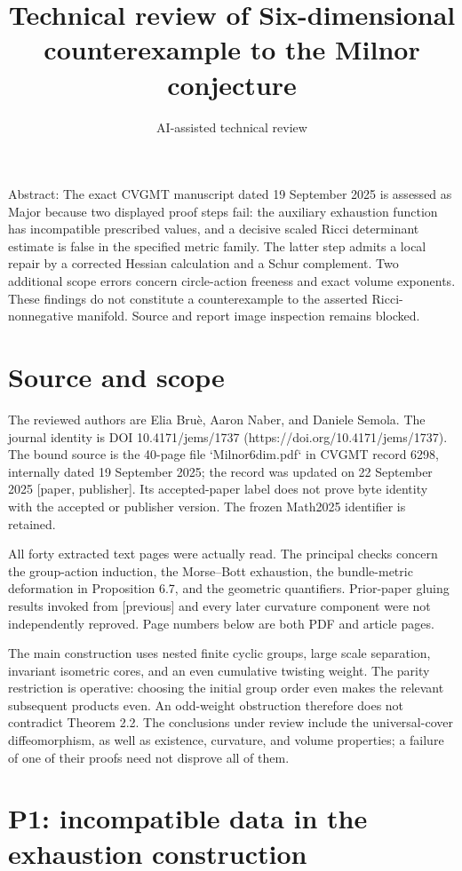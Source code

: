 \documentclass[10pt]{article}
\title{Technical review of Six-dimensional counterexample to the Milnor conjecture}
\author{AI-assisted technical review}
\date{}
\begin{document}
\maketitle
Abstract: The exact CVGMT manuscript dated 19 September 2025 is assessed as Major because two displayed proof steps fail: the auxiliary exhaustion function has incompatible prescribed values, and a decisive scaled Ricci determinant estimate is false in the specified metric family. The latter step admits a local repair by a corrected Hessian calculation and a Schur complement. Two additional scope errors concern circle-action freeness and exact volume exponents. These findings do not constitute a counterexample to the asserted Ricci-nonnegative manifold. Source and report image inspection remains blocked.\par
\section*{Source and scope}
The reviewed authors are Elia Bruè, Aaron Naber, and Daniele Semola. The journal identity is DOI 10.4171/jems/1737 (https://doi.org/10.4171/jems/1737). The bound source is the 40-page file `Milnor6dim.pdf` in CVGMT record 6298, internally dated 19 September 2025; the record was updated on 22 September 2025 [paper, publisher]. Its accepted-paper label does not prove byte identity with the accepted or publisher version. The frozen Math2025 identifier is retained.\par
All forty extracted text pages were actually read. The principal checks concern the group-action induction, the Morse–Bott exhaustion, the bundle-metric deformation in Proposition 6.7, and the geometric quantifiers. Prior-paper gluing results invoked from [previous] and every later curvature component were not independently reproved. Page numbers below are both PDF and article pages.\par
The main construction uses nested finite cyclic groups, large scale separation, invariant isometric cores, and an even cumulative twisting weight. The parity restriction is operative: choosing the initial group order even makes the relevant subsequent products even. An odd-weight obstruction therefore does not contradict Theorem 2.2. The conclusions under review include the universal-cover diffeomorphism, as well as existence, curvature, and volume properties; a failure of one of their proofs need not disprove all of them.\par
\section*{P1: incompatible data in the exhaustion construction}
\end{document}
